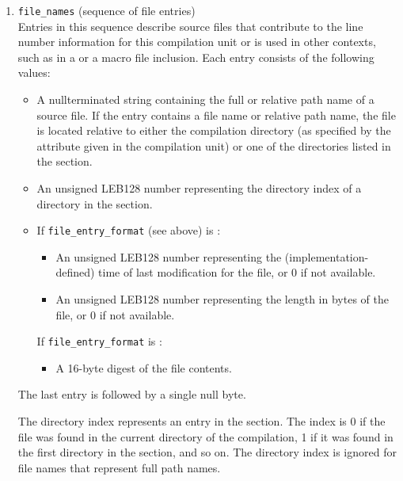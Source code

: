 \begin{enumerate}[1. ]
\item  \texttt{file\_names} (sequence of file entries) \\
Entries 
in 
this sequence describe source files that contribute
to the line number information for this compilation unit or is
used in other contexts, such as in a 
 or
a macro file inclusion. Each entry consists of the following
values:


\begin{itemize}
\item A null\dash terminated string containing the full or relative
path name of a source file. If the entry contains a file
name or relative path name, the file is located relative
to either the compilation directory (as specified by the
\DWATcompdir{} 
attribute given in the compilation unit) or one
of the directories listed in the 
 section.

\item An unsigned LEB128 
number representing the directory
index of a directory in the 
 section.

\item If \texttt{file\_entry\_format} (see above) is \DWLNFtimestampsize:
\begin{itemize}
    \item An unsigned LEB128
    number representing the
    (implementation-\linebreak[0]defined) time of last modification for
    the file, or 0 if not available.

    \item An unsigned LEB128 
    number representing the length in
    bytes of the file, or 0 if not available.  
\end{itemize}
If \texttt{file\_entry\_format} is \DWLNFMDfive:
\begin{itemize}
\item A 16-byte \MDfive{} digest of the file contents.
\end{itemize}

\end{itemize}

The last entry is followed by a single null byte.

The directory index represents an entry in the
 section. 
The index is 0 if the file was
found in the current directory of the compilation, 1 if it
was found in the first directory in the 
section, and so on. The directory index is ignored for file
names that represent full path names.


\end{enumerate}
